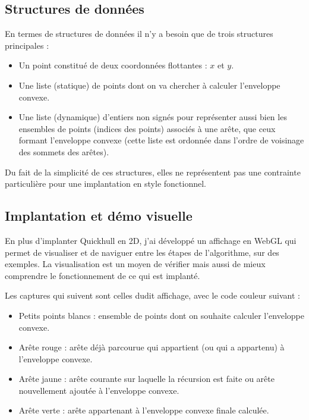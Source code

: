 \documentclass[]{article}
\begin{document}
\subsection{Structures de données}
En termes de structures de données il n'y a besoin que de trois structures principales :
\begin{itemize}
	\item Un point constitué de deux coordonnées flottantes : $x$ et $y$.
	\item Une liste (statique) de points dont on va chercher à calculer l'enveloppe convexe.
	\item Une liste (dynamique) d'entiers non signés pour représenter aussi bien les ensembles de points (indices des points) associés à une arête, que ceux formant l'enveloppe convexe (cette liste est ordonnée dans l'ordre de voisinage des sommets des arêtes).
\end{itemize}

Du fait de la simplicité de ces structures, elles ne représentent pas une contrainte particulière pour une implantation en style fonctionnel.

\subsection{Implantation et démo visuelle}
En plus d'implanter Quickhull en 2D, j'ai développé un affichage en WebGL qui permet de visualiser et de naviguer entre les étapes de l'algorithme, sur des exemples. La visualisation est un moyen de vérifier mais aussi de mieux comprendre le fonctionnement de ce qui est implanté.

Les captures qui suivent sont celles dudit affichage, avec le code couleur suivant :
\begin{itemize}
	\item Petits points blancs : ensemble de points dont on souhaite calculer l'enveloppe convexe.
	\item Arête rouge : arête déjà parcourue qui appartient (ou qui a appartenu) à l'enveloppe convexe.
	\item Arête jaune : arête courante sur laquelle la récursion est faite ou arête nouvellement ajoutée à l'enveloppe convexe.
	\item Arête verte : arête appartenant à l'enveloppe convexe finale calculée.
\end{itemize}
\end{document}
